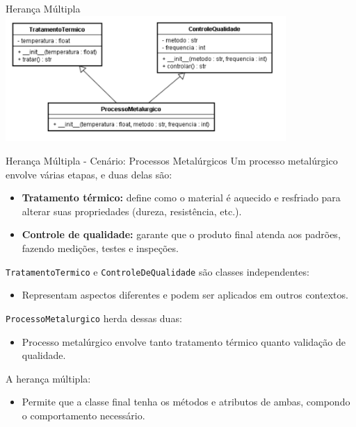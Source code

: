 \begin{frame}{Herança Múltipla}
    \centering
    \includegraphics[width=0.8\textwidth]{Images/heranca-multipla.png}
\end{frame}

\begin{frame}{Herança Múltipla - Cenário: Processos Metalúrgicos}
Um processo metalúrgico envolve várias etapas, e duas delas são:

\begin{itemize}
    \item \textbf{Tratamento térmico:} define como o material é aquecido e resfriado para alterar suas propriedades (dureza, resistência, etc.).
    \item \textbf{Controle de qualidade:} garante que o produto final atenda aos padrões, fazendo medições, testes e inspeções.
\end{itemize}


\texttt{TratamentoTermico} e \texttt{ControleDeQualidade} são classes independentes:
\begin{itemize}
    \item Representam aspectos diferentes e podem ser aplicados em outros contextos. 
\end{itemize}


\texttt{ProcessoMetalurgico} herda dessas duas:
\begin{itemize}
    \item Processo metalúrgico envolve tanto tratamento térmico quanto validação de qualidade.  
\end{itemize}


A herança múltipla: 
\begin{itemize}
    \item Permite que a classe final tenha os métodos e atributos de ambas, compondo o comportamento necessário.
\end{itemize}
\end{frame}

